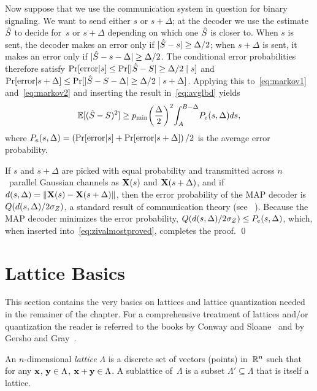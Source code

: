 \begin{subappendices}
  Now suppose that we use the communication system in question for binary
  signaling. We want to send either $s$ or $s+\Delta$; at the decoder we use the
  estimate~${\hat{S}}$ to decide for~$s$ or $s + \Delta$ depending on which one ${\hat{S}}$
  is closer to. When $s$ is sent, the decoder makes an error only if $|{\hat{S}} - s|
  \ge \Delta/2$; when $s + \Delta$ is sent, it makes an error only if $|{\hat{S}} - s
  - \Delta| \ge \Delta/2$. The conditional error probabilities therefore satisfy
  $\Pr[\text{error} | s] \le \Pr[|{\hat{S}} - S| \ge \Delta/2 \mid s]$ and
  $\Pr[\text{error} | s + \Delta] \le \Pr[|{\hat{S}} - S - \Delta| \ge \Delta/2 \mid s +
  \Delta]$. Applying this to~\eqref{eq:markov1} and~\eqref{eq:markov2} and
  inserting the result in~\eqref{eq:avglbd} yields
  \begin{equation}
    \label{eq:zivalmostproved}
    {\mathbb{E}[({\hat{S}}- S)^2]} \ge {p_{\min}} {\left(\frac{\Delta}{2}\right)^2} {\int_A^{B-\Delta}} P_e(s, \Delta) ds,
  \end{equation}
  where $P_e(s, \Delta) = \left(\Pr[\text{error}|s] + \Pr[\text{error}|s +
  \Delta] \right)/2$ is the average error probability.

  If $s$ and $s+\Delta$ are picked with equal probability and transmitted across
  $n$~parallel Gaussian channels as $\mathbf{X}(s)$ and $\mathbf{X}(s+\Delta)$, and if $d(s,
  \Delta) = \| \mathbf{X}(s) - \mathbf{X}(s + \Delta)\|$, then the error probability of the MAP
  decoder is $Q(d(s,\Delta) / 2 {\sigma_Z})$, a standard result of communication theory
  (see \eg~\cite[Section~4.5]{WozencraftJ1965}). Because the MAP decoder minimizes
  the error probability, $Q(d(s,\Delta)/2{\sigma_Z}) \le P_e(s,\Delta)$, which, when
  inserted into~\eqref{eq:zivalmostproved}, completes the proof. \hfill\qed



  \section{Lattice Basics}\label{app:latticebasics}

  This section contains the very basics on lattices and lattice quantization
  needed in the remainer of the chapter. For a comprehensive treatment of
  lattices and/or quantization the reader is referred to the books by Conway and
  Sloane~\cite{ConwayS1988} and by Gersho and Gray~\cite{GershoG1992}.

  \begin{definition}
    An $n$-dimensional \emph{lattice} $\Lambda$ is a discrete set of vectors
    (points) in~$\mathbb{R}^n$ such that for any $\mathbf{x}$, $\mathbf{y} \in \Lambda$, $\mathbf{x} + \mathbf{y} \in
    \Lambda$. A sublattice of~$\Lambda$ is a subset $\Lambda' \subseteq \Lambda$
    that is itself a lattice. 
  \end{definition}


\end{subappendices}
